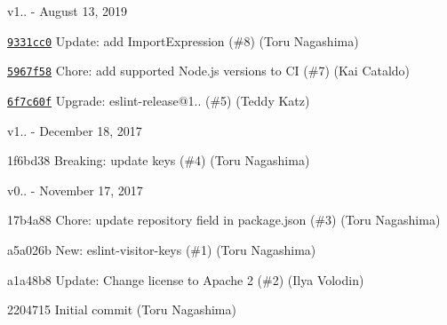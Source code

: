 v1.. -\/ August 13, 2019


\begin{DoxyItemize}
\item \href{https://github.com/eslint/eslint-visitor-keys/commit/9331cc09e756e65b9044c9186445a474b037fac6}{\texttt{ {\ttfamily 9331cc0}}} Update\+: add Import\+Expression (\#8) (Toru Nagashima)
\item \href{https://github.com/eslint/eslint-visitor-keys/commit/5967f583b04f17fba9226aaa394e45d476d2b8af}{\texttt{ {\ttfamily 5967f58}}} Chore\+: add supported Node.\+js versions to CI (\#7) (Kai Cataldo)
\item \href{https://github.com/eslint/eslint-visitor-keys/commit/6f7c60fef2ceec9f6323202df718321cec45cab0}{\texttt{ {\ttfamily 6f7c60f}}} Upgrade\+: eslint-\/release@1.. (\#5) (Teddy Katz)
\end{DoxyItemize}

v1.. -\/ December 18, 2017


\begin{DoxyItemize}
\item 1f6bd38 Breaking\+: update keys (\#4) (Toru Nagashima)
\end{DoxyItemize}

v0.. -\/ November 17, 2017


\begin{DoxyItemize}
\item 17b4a88 Chore\+: update {\ttfamily repository} field in package.\+json (\#3) (Toru Nagashima)
\item a5a026b New\+: eslint-\/visitor-\/keys (\#1) (Toru Nagashima)
\item a1a48b8 Update\+: Change license to Apache 2 (\#2) (Ilya Volodin)
\item 2204715 Initial commit (Toru Nagashima) 
\end{DoxyItemize}